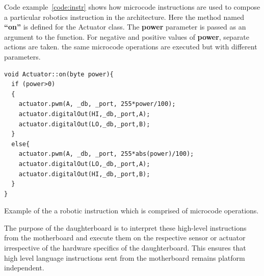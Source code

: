 	Code example~\ref{code:instr} shows how microcode instructions are used to compose a particular robotics instruction in the \xten architecture. Here the method named \textbf{``on''} is defined for the Actuator class. The \textbf{power} parameter is passed as an argument to the function. For negative and positive values of \textbf{power}, separate actions are taken. the same microcode operations are executed but with different parameters.
	\begin{listing}
		\footnotesize
		\begin{verbatim}
void Actuator::on(byte power){
  if (power>0)
  {
    actuator.pwm(A, _db, _port, 255*power/100);
    actuator.digitalOut(HI,_db,_port,A);
    actuator.digitalOut(LO,_db,_port,B);
  }
  else{
    actuator.pwm(A, _db, _port, 255*abs(power)/100);
    actuator.digitalOut(LO,_db,_port,A);
    actuator.digitalOut(HI,_db,_port,B);
  }
}
		\end{verbatim}
		\caption{Example of the a robotic instruction which is comprised of microcode operations.}\label{code:instr}
	\end{listing}
	
	
	The purpose of the daughterboard is to interpret these high-level instructions from the motherboard and execute them on the respective sensor or actuator irrespective of the hardware specifics of the daughterboard. This ensures that high level language instructions sent from the motherboard remains platform independent.
	
	
	
